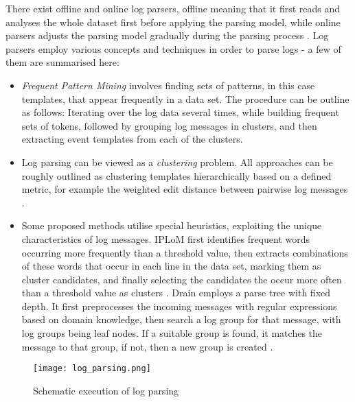 There exist offline and online log parsers, offline meaning that it first reads and analyses the whole dataset first before applying the parsing model, while online parsers adjusts the parsing model gradually during the parsing process \cite{he2017drain}. Log parsers employ various concepts and techniques in order to parse logs - a few of them are summarised here:
\begin{itemize}
\setlength\itemsep{0em}
	\item \textit{Frequent Pattern Mining} involves finding sets of patterns, in this case templates, that appear frequently in a data set. The procedure can be outline as follows: Iterating over the log data several times, while building frequent sets of tokens, followed by grouping log messages in clusters, and then extracting event templates from each of the clusters.
	\item Log parsing can be viewed as a \textit{clustering} problem. All approaches can be roughly outlined as clustering templates hierarchically based on a defined metric, for example the weighted edit distance between pairwise log messages \cite{zhu2019tools}.
	\item Some proposed methods utilise special heuristics, 	exploiting the unique characteristics of log messages. IPLoM first identifies frequent words occurring more frequently than a threshold value, then extracts combinations of these words that occur in each line in the data set, marking them as cluster candidates, and finally selecting the candidates the occur more often than a threshold value as clusters \cite{makanju2009clustering}. Drain employs a parse tree with fixed depth. It first preprocesses the incoming messages with regular expressions based on domain knowledge, then search a log group for that message, with log groups being leaf nodes. If a suitable group is found, it matches the message to that group, if not, then a new group is created \cite{he2017drain}.
\end{itemize}


\begin{figure}[h]
  \centering
  \texttt{[image: log\_parsing.png]}\\
  \caption{Schematic execution of log parsing \cite{zhu2019tools}}
  \label{fig:parsing}
\end{figure}

